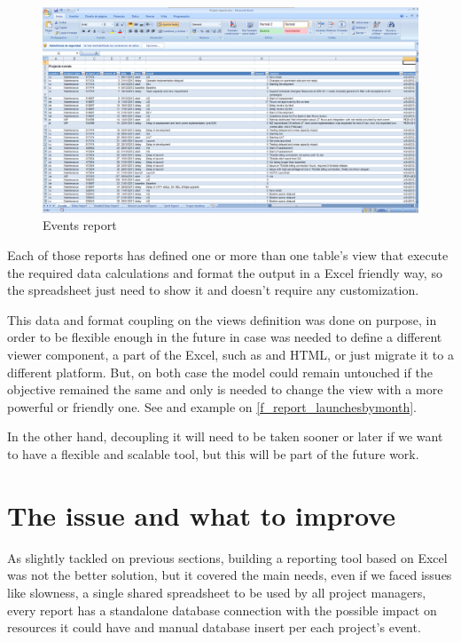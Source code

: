 \begin{figure}[ht!]
	\centering
   	\includegraphics[width=1\textwidth]{./resources/report_events.png}
   	\caption{Events report}
   	\label{f_report_events}
\end{figure}

Each of those reports has defined one or more than one table's view that execute
the required data calculations and format the output in a Excel friendly way, so
the spreadsheet just need to show it and doesn't require any customization. 

This data and format coupling on the views definition was done on purpose,
in order to be flexible enough in the future in case was needed to define a
different viewer component, a part of the Excel, such as and HTML, or just
migrate it to a different platform. But, on both case the model could remain
untouched if the objective remained the same and only is needed to change the
view with a more powerful or friendly one. See and example on
\ref{f_report_launchesbymonth}.



In the other hand, decoupling it will need to be taken sooner or later if
we want to have a flexible and scalable tool, but this will be part of the
future work.

\section{The issue and what to improve}
As slightly tackled on previous sections, building a reporting tool based on
Excel was not the better solution, but it covered the main needs, even if we
faced issues like slowness, a single shared spreadsheet to be used by all
project managers, every report has a standalone database connection with the
possible impact on resources it could have and manual database insert per
each project's event.

